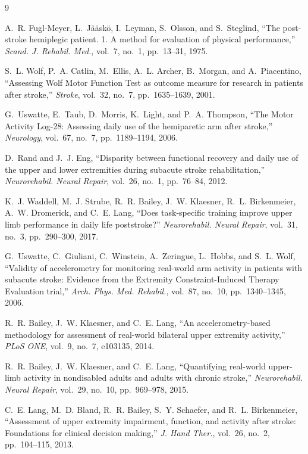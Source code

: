 \documentclass[conference]{IEEEtran}
\begin{document}
\begin{thebibliography}{9}

A.~R. Fugl-Meyer, L.~J{\"a}{\"a}sk{\"o}, I.~Leyman, S.~Olsson, and S.~Steglind,
``The post-stroke hemiplegic patient. 1. A method for evaluation of physical
performance,'' \emph{Scand. J. Rehabil. Med.}, vol.~7, no.~1, pp.~13--31, 1975.

S.~L. Wolf, P.~A. Catlin, M.~Ellis, A.~L. Archer, B.~Morgan, and A.~Piacentino,
``Assessing Wolf Motor Function Test as outcome measure for research in patients
after stroke,'' \emph{Stroke}, vol.~32, no.~7, pp.~1635--1639, 2001.

G.~Uswatte, E.~Taub, D.~Morris, K.~Light, and P.~A. Thompson, ``The Motor
Activity Log-28: Assessing daily use of the hemiparetic arm after stroke,''
\emph{Neurology}, vol.~67, no.~7, pp.~1189--1194, 2006.

D.~Rand and J.~J. Eng, ``Disparity between functional recovery and daily use of
the upper and lower extremities during subacute stroke rehabilitation,''
\emph{Neurorehabil. Neural Repair}, vol.~26, no.~1, pp.~76--84, 2012.

K.~J. Waddell, M.~J. Strube, R.~R. Bailey, J.~W. Klaesner, R.~L. Birkenmeier,
A.~W. Dromerick, and C.~E. Lang, ``Does task-specific training improve upper
limb performance in daily life poststroke?'' \emph{Neurorehabil. Neural Repair},
vol.~31, no.~3, pp.~290--300, 2017.

G.~Uswatte, C.~Giuliani, C.~Winstein, A.~Zeringue, L.~Hobbs, and S.~L. Wolf,
``Validity of accelerometry for monitoring real-world arm activity in patients
with subacute stroke: Evidence from the Extremity Constraint-Induced Therapy
Evaluation trial,'' \emph{Arch. Phys. Med. Rehabil.}, vol.~87, no.~10,
pp.~1340--1345, 2006.

R.~R. Bailey, J.~W. Klaesner, and C.~E. Lang, ``An accelerometry-based
methodology for assessment of real-world bilateral upper extremity activity,''
\emph{PLoS ONE}, vol.~9, no.~7, e103135, 2014.

R.~R. Bailey, J.~W. Klaesner, and C.~E. Lang, ``Quantifying real-world upper-limb
activity in nondisabled adults and adults with chronic stroke,''
\emph{Neurorehabil. Neural Repair}, vol.~29, no.~10, pp.~969--978, 2015.

C.~E. Lang, M.~D. Bland, R.~R. Bailey, S.~Y. Schaefer, and R.~L. Birkenmeier,
``Assessment of upper extremity impairment, function, and activity after stroke:
Foundations for clinical decision making,'' \emph{J. Hand Ther.}, vol.~26,
no.~2, pp.~104--115, 2013.

\end{thebibliography}
\end{document}
